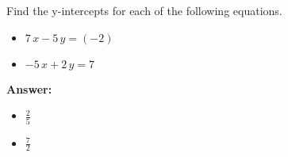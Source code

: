  Find the y-intercepts for each of the following equations. \begin{itemize}\item \( 7 \, x - 5 \, y = \left(-2\right) \)\item \( -5 \, x + 2 \, y = 7 \)\end{itemize}

        \textbf{Answer:} \begin{itemize}\item \( \frac{2}{5} \)\item \( \frac{7}{2} \)\end{itemize}
